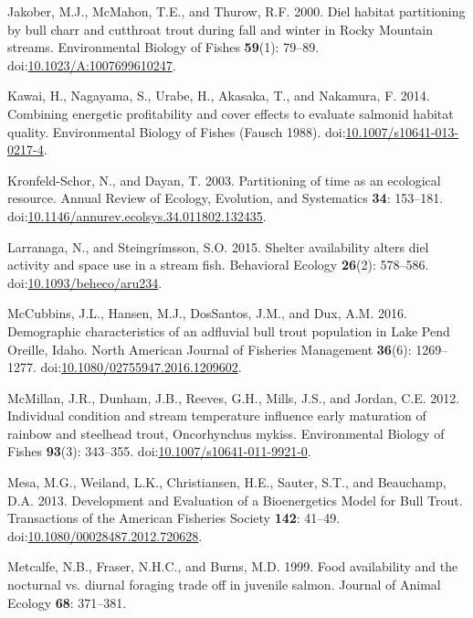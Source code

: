 \documentclass[]{article}
\begin{document}
\hypertarget{ref-Jakober2000}{}
Jakober, M.J., McMahon, T.E., and Thurow, R.F. 2000. Diel habitat
partitioning by bull charr and cutthroat trout during fall and winter in
Rocky Mountain streams. Environmental Biology of Fishes \textbf{59}(1):
79--89.
doi:\href{https://doi.org/10.1023/A:1007699610247}{10.1023/A:1007699610247}.

\hypertarget{ref-Kawai2014}{}
Kawai, H., Nagayama, S., Urabe, H., Akasaka, T., and Nakamura, F. 2014.
Combining energetic profitability and cover effects to evaluate salmonid
habitat quality. Environmental Biology of Fishes (Fausch 1988).
doi:\href{https://doi.org/10.1007/s10641-013-0217-4}{10.1007/s10641-013-0217-4}.

\hypertarget{ref-Kronfeld}{}
Kronfeld-Schor, N., and Dayan, T. 2003. Partitioning of time as an
ecological resource. Annual Review of Ecology, Evolution, and
Systematics \textbf{34}: 153--181.
doi:\href{https://doi.org/10.1146/annurev.ecolsys.34.011802.132435}{10.1146/annurev.ecolsys.34.011802.132435}.

\hypertarget{ref-Larranaga2015}{}
Larranaga, N., and Steingrímsson, S.O. 2015. Shelter availability alters
diel activity and space use in a stream fish. Behavioral Ecology
\textbf{26}(2): 578--586.
doi:\href{https://doi.org/10.1093/beheco/aru234}{10.1093/beheco/aru234}.

\hypertarget{ref-McCubbins2016}{}
McCubbins, J.L., Hansen, M.J., DosSantos, J.M., and Dux, A.M. 2016.
Demographic characteristics of an adfluvial bull trout population in
Lake Pend Oreille, Idaho. North American Journal of Fisheries Management
\textbf{36}(6): 1269--1277.
doi:\href{https://doi.org/10.1080/02755947.2016.1209602}{10.1080/02755947.2016.1209602}.

\hypertarget{ref-McMillan2012}{}
McMillan, J.R., Dunham, J.B., Reeves, G.H., Mills, J.S., and Jordan,
C.E. 2012. Individual condition and stream temperature influence early
maturation of rainbow and steelhead trout, Oncorhynchus mykiss.
Environmental Biology of Fishes \textbf{93}(3): 343--355.
doi:\href{https://doi.org/10.1007/s10641-011-9921-0}{10.1007/s10641-011-9921-0}.

\hypertarget{ref-Mesa2013}{}
Mesa, M.G., Weiland, L.K., Christiansen, H.E., Sauter, S.T., and
Beauchamp, D.A. 2013. Development and Evaluation of a Bioenergetics
Model for Bull Trout. Transactions of the American Fisheries Society
\textbf{142}: 41--49.
doi:\href{https://doi.org/10.1080/00028487.2012.720628}{10.1080/00028487.2012.720628}.

\hypertarget{ref-Metcalfe1999}{}
Metcalfe, N.B., Fraser, N.H.C., and Burns, M.D. 1999. Food availability
and the nocturnal vs. diurnal foraging trade off in juvenile salmon.
Journal of Animal Ecology \textbf{68}: 371--381.
\end{document}
